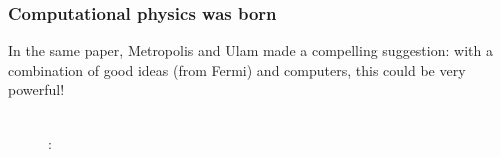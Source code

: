 \documentclass[hyperref={colorlinks=true}]{beamer}
\begin{document}
\begin{frame}%
  \frametitle{Computational physics was born}
  
  In the same paper, Metropolis and Ulam made a compelling suggestion: with a combination of good ideas (from Fermi) and computers, this could be very powerful!
  
  \begin{figure}
    \centering
    \\
    :\\

\end{figure}
\end{frame}
\end{document}
